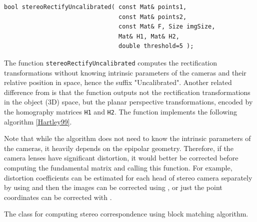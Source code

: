 \begin{lstlisting}
bool stereoRectifyUncalibrated( const Mat& points1,
                                const Mat& points2,
                                const Mat& F, Size imgSize,
                                Mat& H1, Mat& H2,
                                double threshold=5 );
\end{lstlisting}
\begin{description}
\end{description}

The function \texttt{stereoRectifyUncalibrated} computes the rectification transformations without knowing intrinsic parameters of the cameras and their relative position in space, hence the suffix "Uncalibrated". Another related difference from  is that the function outputs not the rectification transformations in the object (3D) space, but the planar perspective transformations, encoded by the homography matrices \texttt{H1} and \texttt{H2}. The function implements the following algorithm \href{\#Hartly99}{[Hartley99]}. 

Note that while the algorithm does not need to know the intrinsic parameters of the cameras, it heavily depends on the epipolar geometry. Therefore, if the camera lenses have significant distortion, it would better be corrected before computing the fundamental matrix and calling this function. For example, distortion coefficients can be estimated for each head of stereo camera separately by using  and then the images can be corrected using , or just the point coordinates can be corrected with . 

\label{StereoBM}
The class for computing stereo correspondence using block matching algorithm.

